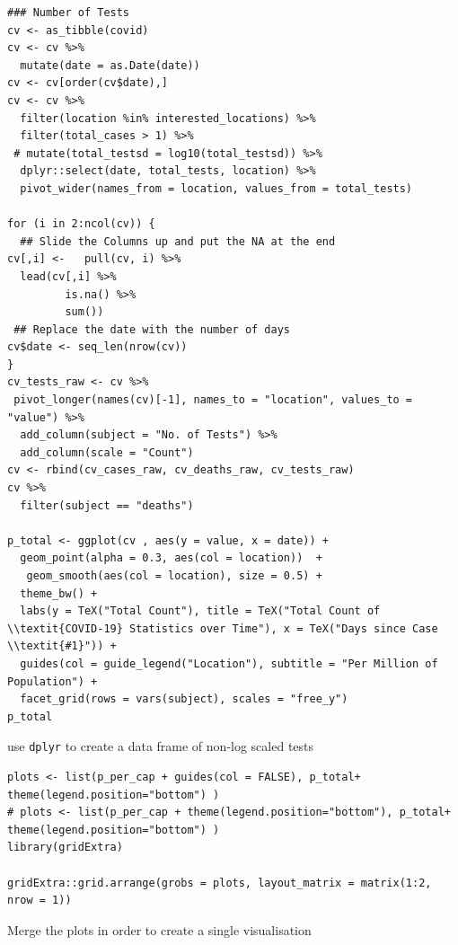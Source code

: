 \documentclass[11pt]{article}
\begin{document}
\begin{listing}[htbp]
\begin{verbatim}
### Number of Tests
cv <- as_tibble(covid)
cv <- cv %>%
  mutate(date = as.Date(date))
cv <- cv[order(cv$date),]
cv <- cv %>%
  filter(location %in% interested_locations) %>%
  filter(total_cases > 1) %>%
 # mutate(total_testsd = log10(total_testsd)) %>%
  dplyr::select(date, total_tests, location) %>%
  pivot_wider(names_from = location, values_from = total_tests)

for (i in 2:ncol(cv)) {
  ## Slide the Columns up and put the NA at the end
cv[,i] <-   pull(cv, i) %>%
  lead(cv[,i] %>%
         is.na() %>%
         sum())
 ## Replace the date with the number of days
cv$date <- seq_len(nrow(cv))
}
cv_tests_raw <- cv %>%
 pivot_longer(names(cv)[-1], names_to = "location", values_to = "value") %>%
  add_column(subject = "No. of Tests") %>%
  add_column(scale = "Count")
cv <- rbind(cv_cases_raw, cv_deaths_raw, cv_tests_raw)
cv %>%
  filter(subject == "deaths")

p_total <- ggplot(cv , aes(y = value, x = date)) +
  geom_point(alpha = 0.3, aes(col = location))  +
   geom_smooth(aes(col = location), size = 0.5) +
  theme_bw() +
  labs(y = TeX("Total Count"), title = TeX("Total Count of \\textit{COVID-19} Statistics over Time"), x = TeX("Days since Case \\textit{#1}")) +
  guides(col = guide_legend("Location"), subtitle = "Per Million of Population") +
  facet_grid(rows = vars(subject), scales = "free_y")
p_total
\end{verbatim}
\caption{\label{orge990e83}use \texttt{dplyr} to create a data frame of non-log scaled tests}
\end{listing}

\begin{listing}[htbp]
\begin{verbatim}
plots <- list(p_per_cap + guides(col = FALSE), p_total+ theme(legend.position="bottom") )
# plots <- list(p_per_cap + theme(legend.position="bottom"), p_total+ theme(legend.position="bottom") )
library(gridExtra)

gridExtra::grid.arrange(grobs = plots, layout_matrix = matrix(1:2, nrow = 1))
\end{verbatim}
\caption{\label{org200144a}Merge the plots in order to create a single visualisation}
\end{listing}
\end{document}
